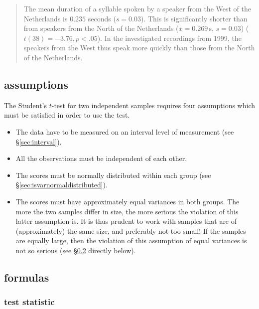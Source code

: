 \documentclass[
]{book}
\begin{document}
\begin{quote}
The mean duration of a syllable spoken by a speaker from the West
of the Netherlands is \(0.235\) seconds (\(s=0.03\)). This is
significantly shorter than from speakers from the North of the Netherlands
(\(\overline{x}=0.269\) s, \(s=0.03\)) (\(t(38)=-3.76, p<.05\)). In the
investigated recordings from 1999, the speakers from the West thus
speak more quickly than those from the North of the Netherlands.
\end{quote}

\hypertarget{sec:ttest-unpaired-assumptions}{%
\subsection{assumptions}\label{sec:ttest-unpaired-assumptions}}

The Student's \(t\)-test for two independent samples requires four assumptions
which must be satisfied in order to use the test.

\begin{itemize}
\item
  The data have to be measured on an interval level of measurement (see
  §\ref{sec:interval}).
\item
  All the observations must be independent of each other.
\item
  The scores must be normally distributed within each group (see
  §\ref{sec:isvarnormaldistributed}).
\item
  The scores must have approximately equal variances in both groups.
  The more the two samples differ in size, the more
  serious the violation of this latter assumption is. It is thus prudent
  to work with samples that are of (approximately) the same size, and preferably not too small! If the samples are equally large, then the violation of this assumption of equal
  variances is not so serious (see §\ref{sec:ttest-formulas} directly below).
\end{itemize}

\hypertarget{sec:ttest-formulas}{%
\subsection{formulas}\label{sec:ttest-formulas}}

\hypertarget{test-statistic}{%
\subsubsection{test statistic}\label{test-statistic}}
\end{document}
